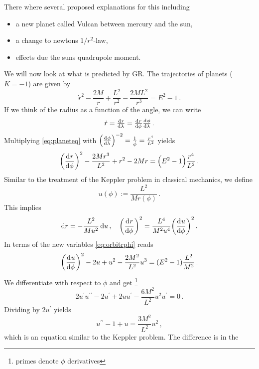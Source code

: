 There where several proposed explanations for this including
\begin{itemize}
  \item a new planet called Vulcan between mercury and the sun,
  \item a change to newtons $1/r^2$-law,
  \item effects due the suns quadrupole moment. 
\end{itemize}
We will now look at what is predicted by GR.
The trajectories of planets ($K=-1$) are given by
\begin{equation}
\dot{r}^2-\frac{2M}{r}+\frac{L^2}{r^2}-\frac{2ML^2}{r^3}=E^2-1\label{eq:planeteq}\,.
\end{equation}
If we think of the radius as a function of the angle, we can write
\begin{equation}
\dot{r}=\od{r}{\lambda}=\od{r}{\phi}\od{\phi}{\lambda}\,.
\end{equation}
Multiplying \eqref{eq:planeteq} with
$\left(\od{\phi}{\lambda}\right)^{-2}=\frac{1}{\dot{\phi}}=\frac{r^4}{L^2}$
yields
\begin{equation}
\left(\dod{r}{\phi}\right)^2-\frac{2Mr^3}{L^2}+r^2-2Mr
=\left(E^2-1\right)\frac{r^4}{L^2}\,.\label{eq:orbitrphi}
\end{equation}
Similar to the treatment of the Keppler problem in classical mechanics, we
define
\begin{equation}
u(\phi):=\frac{L^2}{Mr(\phi)}\,.
\end{equation}
This implies
\begin{equation}
\dif r=-\frac{L^2}{Mu^2}\dif u\,,\quad
\left(\dod{r}{\phi}\right)^2=\frac{L^4}{M^2u^4}\left(\dod{u}{\phi}\right)^2\,.
\end{equation} 
In terms of the new variables \eqref{eq:orbitrphi} reads
\begin{equation}
\left(\dod{u}{\phi}\right)^2-2u+u^2-\frac{2M^2}{L^2}u^3=(E^2-1)\frac{L^2}{M^2}\,.
\end{equation}
We differentiate with respect to $\phi$ and get 
\footnote{primes denote $\phi$
derivatives}
\begin{equation}
2u^\prime u^{\prime\prime}-2u^\prime+2u
u^{\prime}-\frac{6M^2}{L^2}u^2u^\prime=0\,.
\end{equation}
Dividing by $2u^\prime$ yields
\begin{equation}
u^{\prime\prime}-1+u=\frac{3M^2}{L^2}u^2\,,
\end{equation}
which is an equation similar to the Keppler problem. The difference is in the
